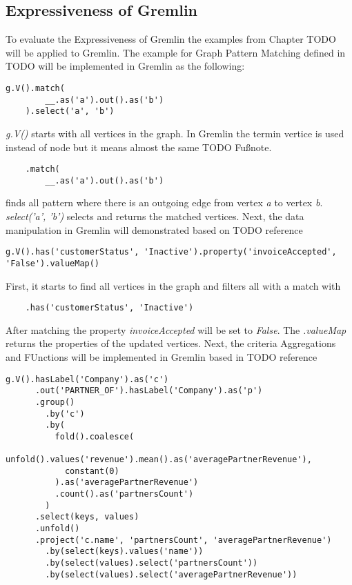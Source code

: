 \subsection{Expressiveness of Gremlin}
To evaluate the Expressiveness of Gremlin the examples from Chapter TODO will be 
applied to Gremlin.
The example for Graph Pattern Matching defined in TODO will be implemented in Gremlin as the following:
\begin{lstlisting}[caption={Graph Pattern Matching in Gremlin}, label={lst:simpleGPMGremlin}]
	g.V().match(
		__.as('a').out().as('b')
	).select('a', 'b')
\end{lstlisting}
\textit{g.V()} starts with all vertices in the graph. In Gremlin the termin vertice is used
instead of node but it means almost the same TODO Fußnote.
\begin{lstlisting}
	.match(
		__.as('a').out().as('b')
\end{lstlisting}
finds all pattern where there is an outgoing edge
from vertex \textit{a} to vertex \textit{b}.
\textit{select('a', 'b')} selects and returns the matched vertices.
Next, the data manipulation in Gremlin will demonstrated based on TODO reference 
\begin{lstlisting}[caption={Updating Vertex Properties in Gremlin}, label={lst:updateGremlin}]
	g.V().has('customerStatus', 'Inactive').property('invoiceAccepted', 'False').valueMap()
\end{lstlisting}
First, it starts to find all vertices in the graph and filters all with a match with
\begin{lstlisting}
	.has('customerStatus', 'Inactive')
\end{lstlisting}
After matching the property \textit{invoiceAccepted} will be set to \textit{False}.
The \textit{.valueMap} returns the properties of the updated vertices.
Next, the criteria Aggregations and FUnctions will be implemented in Gremlin based in TODO reference
\begin{lstlisting}[caption={Aggregation and Functions in Gremlin with Company Nodes}, label={lst:companyAggregationFunctionsGremlin}]
	g.V().hasLabel('Company').as('c')
	  .out('PARTNER_OF').hasLabel('Company').as('p')
	  .group()
	    .by('c')
	    .by(
	      fold().coalesce(
	        unfold().values('revenue').mean().as('averagePartnerRevenue'),
	        constant(0)
	      ).as('averagePartnerRevenue')
	      .count().as('partnersCount')
	    )
	  .select(keys, values)
	  .unfold()
	  .project('c.name', 'partnersCount', 'averagePartnerRevenue')
	    .by(select(keys).values('name'))
	    .by(select(values).select('partnersCount'))
	    .by(select(values).select('averagePartnerRevenue'))
\end{lstlisting}
